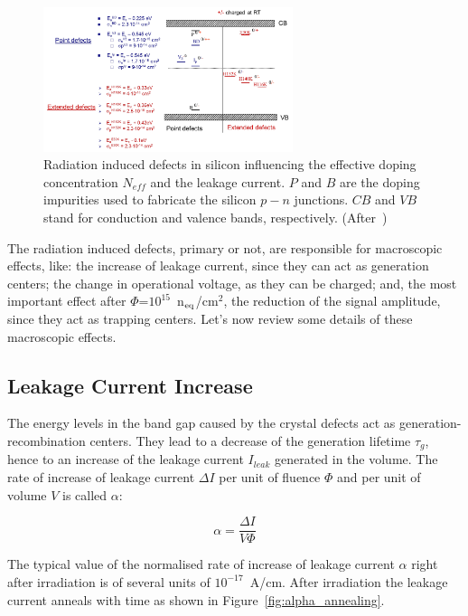 \begin{figure}
\centering
\includegraphics[width=0.65\textwidth]{Defects.pdf}
\caption{\label{fig:Defects}Radiation induced defects in silicon influencing  the  effective doping 
concentration $N_{eff}$ and the leakage current. $P$ and $B$ are the doping impurities
used to fabricate the silicon $p-n$ junctions. $CB$ and $VB$ stand for conduction and valence bands, 
respectively. (After~\cite{DefectsVertexing2016})}
\end{figure}

The radiation induced defects, primary or not, are responsible for macroscopic effects, like: the increase 
of leakage current, since they can act as generation centers; the change in operational voltage, as they 
can be charged; and, the most important effect after $\Phi$=$10^{15}$~n$_{\rm eq}$/cm$^2$, the 
reduction of the signal amplitude, since they act as trapping centers. Let's now review some details 
of these macroscopic effects.

\subsection{Leakage Current Increase}
The energy levels in the band gap caused by the crystal defects act as generation-recombination 
centers. 
They lead to a decrease of the generation lifetime $\tau_g$, hence to an increase of the leakage 
current $I_{leak}$ generated in the volume. The rate of increase of leakage current $\Delta I$ per unit of 
fluence $\Phi$ and per unit of volume $V$ is called $\alpha$:

\begin{equation}
\alpha = \dfrac{\Delta I}{V\Phi}
\label{eq:alpha}
\end{equation}
 
 The typical value of the normalised rate of increase of leakage current $\alpha$ right after irradiation is of several units of $10^{-17}$~A/cm. After 
 irradiation the leakage current anneals with time as shown in Figure~\ref{fig:alpha_annealing}.
 
